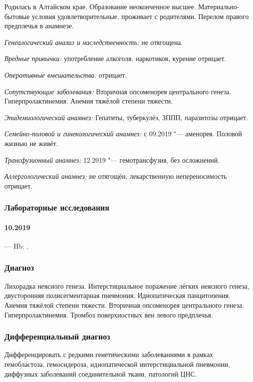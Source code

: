 \documentclass[a4paper,14pt]{extarticle}
\newcommand{\grammliter}{г/л}
\begin{document}
Родилась в Алтайском крае.
Образование неоконченное высшее.
Материально-бытовые условия удовлетворительные, проживает с родителями.
Перелом правого предплечья в анамнезе.

\emph{Генеалогический анализ и наследственность:} не отягощена.

\emph{Вредные привычки:} употребление алкоголя, наркотиков, курение отрицает.

\emph{Оперативные вмешательства:} отрицает.

\emph{Сопутствующие заболевания:} Вторичная опсоменорея центрального генеза. Гиперпролактинемия. Анемия тяжёлой степени тяжести.

\emph{Эпидемиологический анамнез:} Гепатиты, туберкулёз, ЗППП, паразитозы отрицает.

\emph{Семейно-половой и гинекологический анамнез:} с 09.2019 "--- аменорея. Половой жизнью не живёт.

\emph{Трансфузионный анамнез:} 12.2019 "--- гемотрансфузия, без осложнений.

\emph{Аллергологический анамнез:} не отягощён, лекарственную непереносимость отрицает.

\subsubsection*{Лабораторные исследования}

\paragraph{10.2019} --- Hb: \numprint[\grammliter]{89}.

\subsubsection*{Диагноз}
Лихорадка неясного генеза.
Интерстициальное поражение лёгких неясного генеза, двусторонняя полисегментарная пневмония.
Идиопатическая панцитопения.
Анемия тяжёлой степени тяжести.
Вторичная опсоменорея центрального генеза.
Гиперпролактинемия.
Тромбоз поверхностных вен левого предплечья.

\subsubsection*{Дифференциальный диагноз}

Дифференцировать с редкими генетическими заболеваниями в рамках гемобластоза, гемосидероза, идиопатической интерстициальной пневмонии, диффузных заболеваний соединительной ткани, патологий ЦНС.
\end{document}
